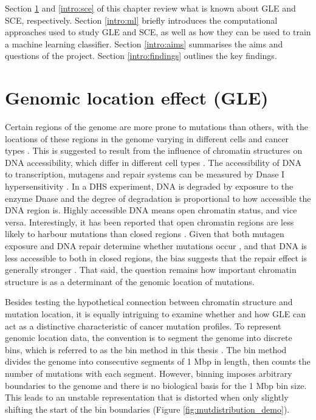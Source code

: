 Section \ref{intro:gle} and \ref{intro:sce} of this chapter review what is known about GLE and SCE, respectively. Section \ref{intro:ml} briefly introduces the computational approaches used to study GLE and SCE, as well as how they can be used to train a machine learning classifier. Section \ref{intro:aims} summarises the aims and questions of the project. Section \ref{intro:findings} outlines the key findings.

\section{Genomic location effect (GLE)}
\label{intro:gle}
Certain regions of the genome are more prone to mutations than others, with the locations of these regions in the genome varying in different cells and cancer types \citep{Polak2015, Jiao2020}. This is suggested to result from the influence of chromatin structures on DNA accessibility, which differ in different cell types \citep{Abascal2020ExpandedGenomes}. The accessibility of DNA to transcription, mutagens and repair systems can be measured by Dnase I hypersensitivity \citep[DHS;][]{Liu2019AApplications}. In a DHS experiment, DNA is degraded by exposure to the enzyme Dnase and the degree of degradation is proportional to how accessible the DNA region is. Highly accessible DNA means open chromatin status, and vice versa. Interestingly, it has been reported that open chromatin regions are less likely to harbour mutations than closed regions \citep{Polak2015,Prendergast2007ChromatinGenome}. Given that both \gls{mutagen} exposure and DNA repair determine whether mutations occur \citep{Ripley2001Mutation}, and that DNA is less accessible to both in closed regions, the bias suggests that the repair effect is generally stronger \citep[Figure \ref{fig:chromatin_demo};][]{Teng1997ExcisionSequences, Morse2002PhotoreactivationCerevisiae}. That said, the question remains how important chromatin structure is as a determinant of the genomic location of mutations. 



Besides testing the hypothetical connection between chromatin structure and mutation location, it is equally intriguing to examine whether and how GLE can act as a distinctive characteristic of cancer mutation profiles. To represent genomic location data, the convention is to segment the genome into discrete bins, which is referred to as the bin method in this thesis \citep{Kubler2019, Salvadores2019PassengerTumors, Chalmers2017AnalysisBurden, Salvadores2020MatchingPatterns}. The bin method divides the genome into consecutive segments of 1 Mbp in length, then counts the number of mutations with each segment. However, binning imposes arbitrary boundaries to the genome and there is no biological basis for the 1 Mbp bin size. This leads to an unstable representation that is distorted when only slightly shifting the start of the bin boundaries (Figure \ref{fig:mutdistribution_demo}). 

